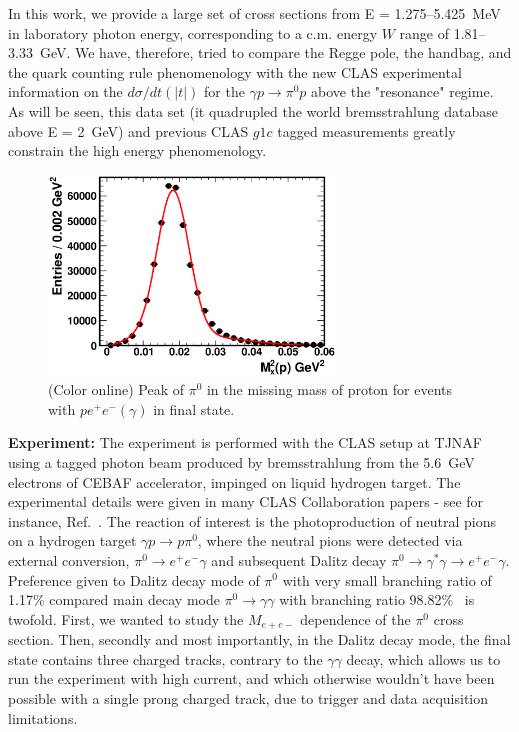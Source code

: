 \documentclass[aps,prc,twocolumn,floatfix,showpacs,preprintnumbers,amsmath,amssymb,superscriptaddress]{revtex4-1}
\begin{document}
In this work, we provide a large set of cross sections from 
E = 1.275--5.425~MeV in laboratory photon energy, 
corresponding to a c.m. energy $W$ range of 1.81--3.33~GeV.  
We have, therefore, tried to 
compare the Regge pole, the
handbag, and the quark counting rule phenomenology with the 
new CLAS experimental information on the $d\sigma/dt(|t|)$ 
for the $\gamma p\to\pi^0p$ above the "resonance" regime. As will 
be seen, this data set (it quadrupled the world bremsstrahlung 
database above E = 2~GeV) and previous CLAS $g1c$ tagged 
measurements greatly constrain the high energy phenomenology.
\begin{figure}[htb!]
\centerline{
        \includegraphics[width=3in, angle=0]{pi0_peak.eps}}

        \caption {(Color online) Peak of $\pi^0$ in the missing
                mass of proton for events with $pe^+e^-(\gamma)$
                in final state.} \label{fig:pi0_peak}
\end{figure}

\textbf{Experiment:} The experiment is performed with the CLAS setup 
at TJNAF using a tagged photon beam produced by bremsstrahlung 
from the 5.6~GeV electrons of CEBAF accelerator, impinged on 
liquid hydrogen target. The experimental details were given 
in many CLAS Collaboration papers - see for instance, 
Ref.~\cite{du07}.  The reaction of interest is the photoproduction 
of neutral pions on a hydrogen target $\gamma p\to p\pi^0$, where
the neutral pions were detected via external conversion, $\pi^0\to 
e^+e^-\gamma$ and subsequent Dalitz decay $\pi^0\to \gamma^\ast
\gamma\to e^+e^-\gamma$. Preference given to Dalitz decay mode of 
$\pi^0$ with very small branching ratio of 1.17\% compared main 
decay mode $\pi^0\to\gamma\gamma$ with branching ratio 
98.82\%~\cite{PDG} is twofold. First, we wanted to study the 
$M_{e+e-}$ dependence of the $\pi^0$ cross section. Then, secondly 
and most importantly, in the Dalitz decay mode, the final state 
contains three charged tracks, contrary to the $\gamma\gamma$ 
decay, which allows us to run the experiment with high current, and 
which otherwise wouldn't have been possible with a single prong 
charged track, due to trigger and data acquisition limitations.
\end{document}

